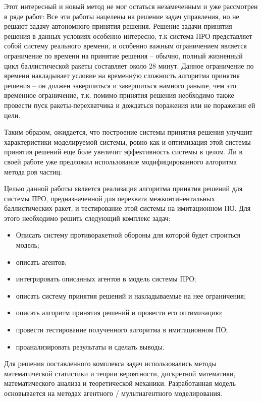 Этот интересный и новый метод не мог остаться незамеченным и уже рассмотрен в ряде работ: 
Все эти работы нацелены на решение задач  управления, но не решают задачу автономного принятия решения. Решение задачи принятия решения в данных условиях особенно интересно, т.к система ПРО представляет собой систему реального времени, и особенно важным ограничением является ограничение по времени на принятие решения -- обычно, полный жизненный цикл баллистической ракеты составляет около 28 минут. Данное ограничение по времени накладывает условие на временн\'yю сложность алгоритма принятия решения -- он должен завершиться и завершиться намного раньше, чем это временное ограничение, т.к. помимо принятия решения необходимо также провести пуск ракеты-перехватчика и дождаться поражения или не поражения ей цели.

Таким образом, ожидается, что построение системы принятия решения улучшит характеристики моделируемой системы, ровно как и оптимизация этой системы принятия решений еще боле увеличит эффективность системы в целом. Ли %
в своей работе уже предложил использование модифицированного алгоритма метода роя частиц.

Целью данной работы является реализация алгоритма принятия решений для системы ПРО, предназначенной для перехвата межконтинентальных баллистических ракет, и тестирование этой системы на имитационном ПО. Для этого необходимо решить следующий комплекс задач:

\begin{itemize}
	\item Описать систему противоракетной обороны для которой будет строиться модель;
	\item описать агентов;
	\item интегрировать описанных агентов в модель системы ПРО;
	\item описать систему принятия решений и накладываемые на нее ограничения;
	\item описать алгоритм принятия решений и провести его оптимизацию;
	\item провести тестирование полученного алгоритма в имитационном ПО;
	\item проанализировать результаты и сделать выводы. 
\end{itemize}

Для решения поставленного комплекса задач использовались методы математической статистики и теории вероятности, дискретной математики, математического анализа и теоретической механики. Разработанная модель основывается на методах агентного / мультиагентного моделирования.

